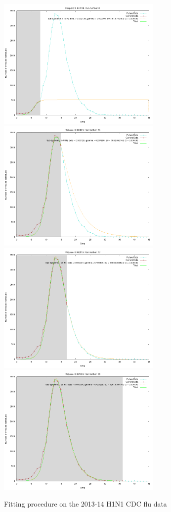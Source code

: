 \begin{centering}
\begin{figure}[h!]
  \includegraphics[width=8cm]{images/single/h1n1.png}
  \includegraphics[width=8cm]{images/single/h1n1b.png}
  \includegraphics[width=8cm]{images/single/h1n1c.png}
  \includegraphics[width=8cm]{images/single/h1n1d.png}
  \caption{Fitting procedure on the 2013-14 H1N1 CDC flu data}
\label{fig:unknown2}
  \end{figure}
\end{centering}


